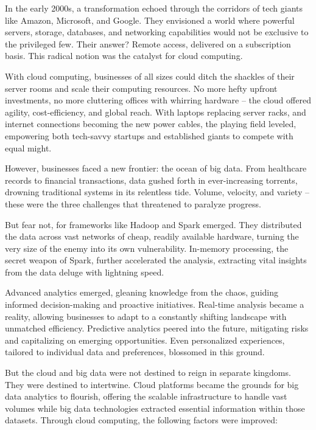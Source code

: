 \documentclass[
  letterpaper,
  DIV=11,
  numbers=noendperiod]{scrreprt}
\begin{document}
In the early 2000s, a transformation echoed through the corridors of
tech giants like Amazon, Microsoft, and Google. They envisioned a world
where powerful servers, storage, databases, and networking capabilities
would not be exclusive to the privileged few. Their answer? Remote
access, delivered on a subscription basis. This radical notion was the
catalyst for cloud computing.

With cloud computing, businesses of all sizes could ditch the shackles
of their server rooms and scale their computing resources. No more hefty
upfront investments, no more cluttering offices with whirring hardware
-- the cloud offered agility, cost-efficiency, and global reach. With
laptops replacing server racks, and internet connections becoming the
new power cables, the playing field leveled, empowering both tech-savvy
startups and established giants to compete with equal might.

However, businesses faced a new frontier: the ocean of big data. From
healthcare records to financial transactions, data gushed forth in
ever-increasing torrents, drowning traditional systems in its relentless
tide. Volume, velocity, and variety -- these were the three challenges
that threatened to paralyze progress.

But fear not, for frameworks like Hadoop and Spark emerged. They
distributed the data across vast networks of cheap, readily available
hardware, turning the very size of the enemy into its own vulnerability.
In-memory processing, the secret weapon of Spark, further accelerated
the analysis, extracting vital insights from the data deluge with
lightning speed.

Advanced analytics emerged, gleaning knowledge from the chaos, guiding
informed decision-making and proactive initiatives. Real-time analysis
became a reality, allowing businesses to adapt to a constantly shifting
landscape with unmatched efficiency. Predictive analytics peered into
the future, mitigating risks and capitalizing on emerging opportunities.
Even personalized experiences, tailored to individual data and
preferences, blossomed in this ground.

But the cloud and big data were not destined to reign in separate
kingdoms. They were destined to intertwine. Cloud platforms became the
grounds for big data analytics to flourish, offering the scalable
infrastructure to handle vast volumes while big data technologies
extracted essential information within those datasets. Through cloud
computing, the following factors were improved:
\end{document}
